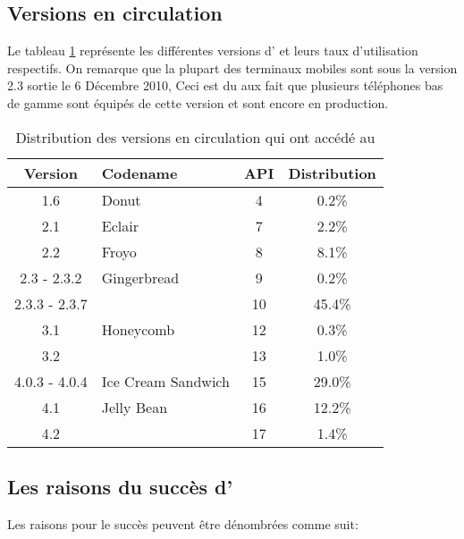 
\subsection{Versions \android{} en circulation}

Le tableau \ref{tab:androidversion} représente les différentes versions
d'\android{} et leurs taux d'utilisation respectifs. On remarque que
la plupart des terminaux mobiles \android{} sont sous la version 2.3
 sortie le 6 Décembre 2010, Ceci est du aux fait que
plusieurs téléphones bas de gamme sont équipés de cette version et sont encore en production.

\begin{table}[H]
\centering
\begin{tabular}{|c|l|c|c|}
\hline
\textsf{Version} & \textsf{Codename} & \textsf{API} &
\textsf{Distribution}\\
\hline
1.6 & Donut & 4 & 0.2\%\\
\hline
2.1 & Eclair & 7 & 2.2\%\\
\hline
2.2 & Froyo & 8 & 8.1\%\\
\hline
2.3 - 2.3.2 & Gingerbread & 9 & 0.2\% \\
\cline{1-1}\cline{3-4}
2.3.3 - 2.3.7 & & 10 & 45.4\%\\
\hline
3.1 & Honeycomb & 12 & 0.3\%\\
\cline{1-1}\cline{3-4}
3.2 & & 13 & 1.0\%\\
\hline
4.0.3 - 4.0.4 & Ice Cream Sandwich & 15 & 29.0\%\\
\hline
4.1 & Jelly Bean & 16 & 12.2\%\\
\cline{1-1}\cline{3-4}
4.2 & & 17 & 1.4\%\\
\hline
\end{tabular}
\caption{Distribution des versions \android{} en circulation qui ont
accédé au \protect\footnotemark[5]}
\label{tab:androidversion}
\end{table}


\subsection[Les raisons du succès d'\android{}]{Les raisons du succès d'\android{}\cite{lft:growth_android}}

Les raisons pour le succès \android{} peuvent être
dénombrées comme suit:

